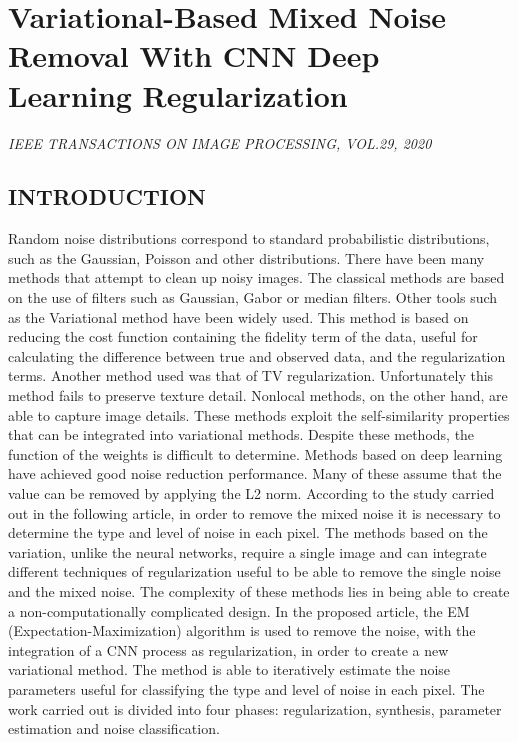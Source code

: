 \section{Variational-Based Mixed Noise Removal With CNN Deep Learning Regularization}

\begin{center}
    \author{
    Faqiang Wang,
    Haiyang Huang,
    Jun Liu
    }
\end{center}

\begin{center}
    \emph{IEEE TRANSACTIONS ON IMAGE PROCESSING, VOL.29, 2020}
\end{center}

\subsection{INTRODUCTION}
Random noise distributions correspond to standard probabilistic distributions, 
such as the Gaussian, Poisson and other distributions. There have 
been many methods that attempt to clean up noisy images. The classical 
methods are based on the use of filters such as Gaussian, Gabor or median 
filters. Other tools such as the Variational method have been widely used. 
This method is based on reducing the cost function containing the fidelity 
term of the data, useful for calculating the difference between true and observed 
data, and the regularization terms. Another method used was that of 
TV regularization. Unfortunately this method fails to preserve texture detail. 
Nonlocal methods, on the other hand, are able to capture image details. 
These methods exploit the self-similarity properties that can be integrated 
into variational methods. Despite these methods, the function of the weights 
is difficult to determine. Methods based on deep learning have achieved good 
noise reduction performance. Many of these assume that the value can be 
removed by applying the L2 norm. According to the study carried out in 
the following article, in order to remove the mixed noise it is necessary to 
determine the type and level of noise in each pixel. The methods based on 
the variation, unlike the neural networks, require a single image and can 
integrate different techniques of regularization useful to be able to remove 
the single noise and the mixed noise. The complexity of these methods lies 
in being able to create a non-computationally complicated design. In the 
proposed article, the EM (Expectation-Maximization) algorithm is used to 
remove the noise, with the integration of a CNN process as regularization, 
in order to create a new variational method. The method is able to iteratively 
estimate the noise parameters useful for classifying the type and level 
of noise in each pixel. The work carried out is divided into four phases: 
regularization, synthesis, parameter estimation and noise classification.

